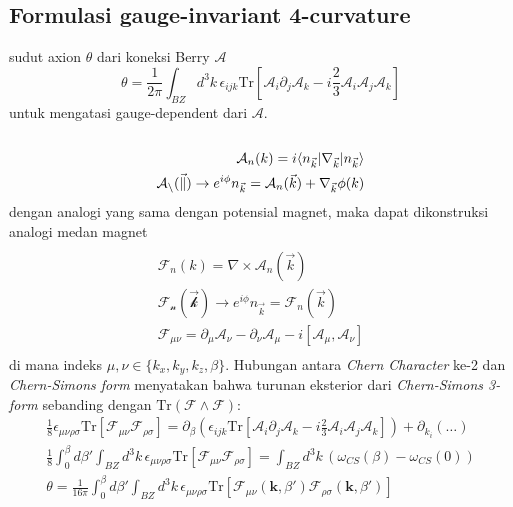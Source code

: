 \subsection{Formulasi gauge-invariant 4-curvature}

sudut axion $\theta$ dari koneksi Berry $\mathcal{A}$
$$
\theta = \frac{1}{2\pi} \int_{BZ} d^3k \, \epsilon_{ijk} \text{Tr} \left[ \mathcal{A}_i \partial_j \mathcal{A}_k - i\frac{2}{3} \mathcal{A}_i \mathcal{A}_j \mathcal{A}_k \right]
$$
untuk mengatasi gauge-dependent dari $\mathcal{A}$.
$$
\begin{align} \\
\mathcal{A}_{n}(k) = i \langle n_{\vec{k}}|\nabla_{\vec{k}}|n_{\vec{k}}\rangle  \\
\mathcal{A_{n}(\vec{k})} \to e^{i\phi}n_{\vec{k}} =\mathcal{A}_{n}(\vec{k}) + \nabla_{\vec{k}}\phi(k) \\
\end{align}
$$
dengan analogi yang sama dengan potensial magnet, maka dapat dikonstruksi analogi medan magnet
$$
\begin{align} \\
\mathcal{F}_{n}(k) = \nabla \times \mathcal{A}_{n}(\vec{k}) \\
\mathcal{F_{n}(\vec{k})} \to e^{i\phi}n_{\vec{k}} =\mathcal{F}_{n}(\vec{k}) \\
\mathcal{F}_{\mu\nu} = \partial_\mu \mathcal{A}_\nu - \partial_\nu \mathcal{A}_\mu - i[\mathcal{A}_\mu, \mathcal{A}_\nu] \\
\end{align}
$$
di mana indeks $\mu, \nu \in \{k_x, k_y, k_z, \beta\}$. Hubungan antara \textit{Chern Character} ke-2 dan \textit{Chern-Simons form} menyatakan bahwa turunan eksterior dari \textit{Chern-Simons 3-form} sebanding dengan $\text{Tr}(\mathcal{F} \wedge \mathcal{F})$:
$$
\begin{align}
\frac{1}{8} \epsilon_{\mu\nu\rho\sigma} \text{Tr}[\mathcal{F}_{\mu\nu} \mathcal{F}_{\rho\sigma}] = \partial_\beta \left( \epsilon_{ijk} \text{Tr} \left[ \mathcal{A}_i \partial_j \mathcal{A}_k - i\frac{2}{3} \mathcal{A}_i \mathcal{A}_j \mathcal{A}_k \right] \right) + \partial_{k_i}(\dots) \\
\frac{1}{8} \int_0^\beta d\beta' \int_{BZ} d^3k \, \epsilon_{\mu\nu\rho\sigma} \text{Tr}[\mathcal{F}_{\mu\nu} \mathcal{F}_{\rho\sigma}] = \int_{BZ} d^3k \, (\omega_{CS}(\beta) - \omega_{CS}(0)) \\
\theta = \frac{1}{16\pi} \int_0^\beta d\beta' \int_{BZ} d^3k \, \epsilon_{\mu\nu\rho\sigma} \text{Tr}[\mathcal{F}_{\mu\nu}(\mathbf{k}, \beta') \mathcal{F}_{\rho\sigma}(\mathbf{k}, \beta')]
\end{align}
$$



